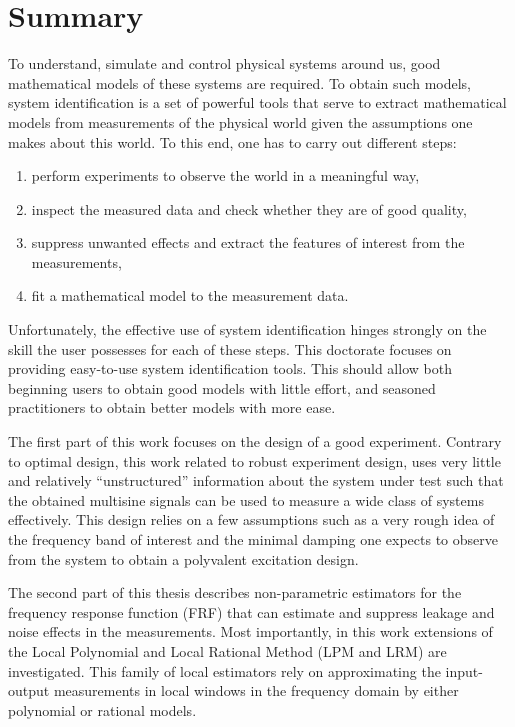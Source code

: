 \chapter{Summary}
To understand, simulate and control physical systems around us, good mathematical models of these systems are required. To obtain such models, system identification is a set of powerful tools that serve to extract mathematical models from measurements of the physical world given the assumptions one makes about this world. To this end, one has to carry out different steps:
\begin{enumerate}
 \item perform experiments to observe the world in a meaningful way,
 \item inspect the measured data and check whether they are of good quality,
 \item suppress unwanted effects and extract the features of interest from the measurements,
\item fit a mathematical model to the measurement data.
\end{enumerate}

Unfortunately, the effective use of system identification hinges strongly on the skill the user possesses for each of these steps. This doctorate focuses on providing easy-to-use system identification tools. This should allow both beginning users to obtain good models with little effort, and seasoned practitioners to obtain better models with more ease.

The first part of this work focuses on the design of a good experiment. Contrary to optimal design, this work related to robust experiment design, uses very little and relatively ``unstructured'' information about the system under test such that the obtained multisine signals can be used to measure a wide class of systems effectively. This design relies on a few assumptions such as a very rough idea of the frequency band of interest and the minimal damping one expects to observe from the system to obtain a polyvalent excitation design.

The second part of this thesis describes non-parametric estimators for the frequency response function (FRF) that can estimate and suppress leakage and noise effects in the measurements. Most importantly, in this work extensions of the Local Polynomial and Local Rational Method (LPM and LRM) are investigated. This family of local estimators rely on approximating the input-output measurements in local windows in the frequency domain by either polynomial or rational models. 

